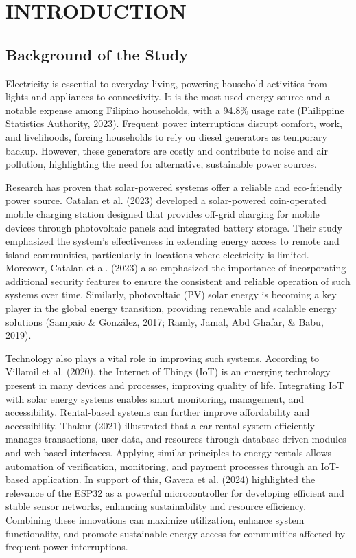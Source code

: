 \chapter{INTRODUCTION}

{\baselineskip
	
\section{Background of the Study}
Electricity is essential to everyday living, powering household activities from lights and appliances to connectivity. It is the most used energy source and a notable expense among Filipino households, with a 94.8\% usage rate (Philippine Statistics Authority, 2023). Frequent power interruptions disrupt comfort, work, and livelihoods, forcing households to rely on diesel generators as temporary backup. However, these generators are costly and contribute to noise and air pollution, highlighting the need for alternative, sustainable power sources.

Research has proven that solar-powered systems offer a reliable and eco-friendly power source. Catalan et al. (2023) developed a solar-powered coin-operated mobile charging station designed that provides off-grid charging for mobile devices through photovoltaic panels and integrated battery storage. Their study emphasized the system’s effectiveness in extending energy access to remote and island communities, particularly in locations where electricity is limited. Moreover, Catalan et al. (2023) also emphasized the importance of incorporating additional security features to ensure the consistent and reliable operation of such systems over time. Similarly, photovoltaic (PV) solar energy is becoming a key player in the global energy transition, providing renewable and scalable energy solutions (Sampaio \& González, 2017; Ramly, Jamal, Abd Ghafar, \& Babu, 2019).

Technology also plays a vital role in improving such systems. According to Villamil et al. (2020), the Internet of Things (IoT) is an emerging technology present in many devices and processes, improving quality of life. Integrating IoT with solar energy systems enables smart monitoring, management, and accessibility. Rental-based systems can further improve affordability and accessibility. Thakur (2021) illustrated that a car rental system efficiently manages transactions, user data, and resources through database-driven modules and web-based interfaces. Applying similar principles to energy rentals allows automation of verification, monitoring, and payment processes through an IoT-based application. In support of this, Gavera et al. (2024) highlighted the relevance of the ESP32 as a powerful microcontroller for developing efficient and stable sensor networks, enhancing sustainability and resource efficiency. Combining these innovations can maximize utilization, enhance system functionality, and promote sustainable energy access for communities affected by frequent power interruptions.

}
